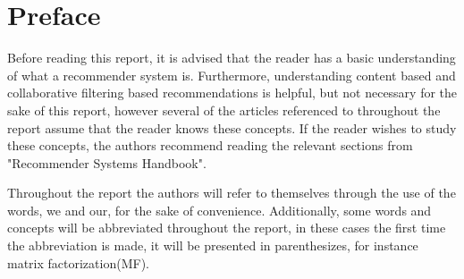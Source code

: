 \chapter*{Preface}
Before reading this report, it is advised that the reader has a basic understanding of what a recommender system is. Furthermore, understanding content based and collaborative filtering based recommendations is helpful, but not necessary for the sake of this report, however several of the articles referenced to throughout the report assume that the reader knows these concepts. If the reader wishes to study these concepts, the authors recommend reading the relevant sections from "Recommender Systems Handbook"\cite{recsyshandbook}.

Throughout the report the authors will refer to themselves through the use of the words, we and our, for the sake of convenience. Additionally, some words and concepts will be abbreviated throughout the report, in these cases the first time the abbreviation is made, it will be presented in parenthesizes, for instance matrix factorization(MF).


